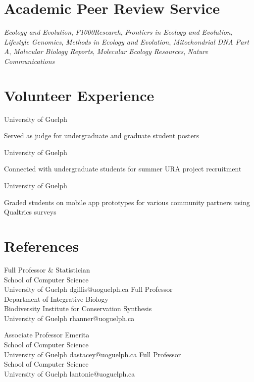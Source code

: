 \section{Academic Peer Review Service}
\textit{Ecology and Evolution}, \textit{F1000Research}, \textit{Frontiers in
Ecology and Evolution}, \textit{Lifestyle Genomics}, \textit{Methods in Ecology and Evolution}, \textit{Mitochondrial DNA
Part A},  \textit{Molecular Biology
Reports}, \textit{Molecular Ecology Resources}, \textit{Nature
Communications}


\section{Volunteer Experience}

University of Guelph
\begin{cvbullets}
  \item Served as judge for undergraduate and graduate student posters
\end{cvbullets}

\medskip

University of Guelph
\begin{cvbullets}
  \item Connected with undergraduate students for summer URA project recruitment
\end{cvbullets}

\medskip
{}
University of Guelph
\begin{cvbullets}
  \item Graded students on mobile app prototypes for various community partners using Qualtrics surveys
\end{cvbullets}

\section{References}
\noindent
{}
  {Full Professor \& Statistician\\ School of Computer Science\\ University of Guelph}
  {dgillis@uoguelph.ca}%
\hfill
{}
  {Full Professor\\ Department of Integrative Biology\\ Biodiversity Institute for Conservation Synthesis\\ University of Guelph}
  {rhanner@uoguelph.ca}

\bigskip
\noindent
{}
  {Associate Professor Emerita\\ School of Computer Science\\ University of Guelph}
  {dastacey@uoguelph.ca}%
\hfill
{}
  {Full Professor\\ School of Computer Science\\ University of Guelph}
  {lantonie@uoguelph.ca}


